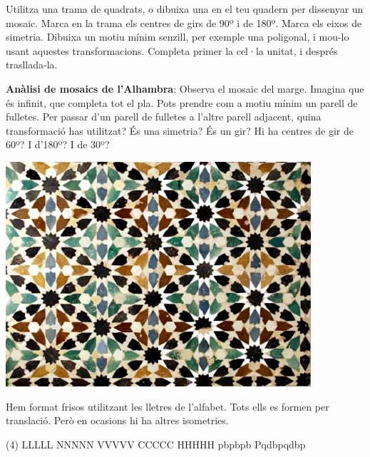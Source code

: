 \begin{mylist}
	
	
	\exer  Utilitza una trama de quadrats, o dibuixa una en el teu quadern per dissenyar un mosaic. Marca en la trama els centres de girs de 90º i de 180º. Marca els eixos de simetria. Dibuixa un motiu mínim senzill, per exemple una poligonal, i mou-lo usant aquestes transformacions. Completa primer la cel·la unitat, i després trasllada-la.
	
	\vspace{-1.5cm}
	\exer \begin{minipage}[t]{0.65\textwidth}
		 \textbf{Anàlisi de mosaics de l'Alhambra}: Observa el mosaic del marge. Imagina que és infinit, que completa tot el pla. Pots prendre com a motiu mínim un parell de fulletes. Per passar d'un parell de fulletes a l'altre parell adjacent, quina transformació has utilitzat? És una simetria? És un gir? Hi ha centres de gir de 60º? I d'180º? I de 30º? 
	\end{minipage}
	\begin{minipage}{0.3\textwidth}
		\centering
		\vspace{1.5cm}
		\includegraphics[width=0.85\textwidth]{img-10/granada}
	\end{minipage}



\exer  Hem format frisos utilitzant les lletres de l'alfabet. Tots ells es formen per translació. Però en ocasions hi ha altres isometries.

\begin{tasks}(4)
\task[L1. ] \quad LLLLL
\task[L2. ] \quad NNNNN
\task[L3. ] \quad VVVVV
\task[L4. ] \quad CCCCC
\task[L5. ] \quad HHHHH
\task[L6. ] \quad pbpbpb
\task[L7. ] \quad Pqdbpqdbp
\end{tasks}


\end{mylist}
